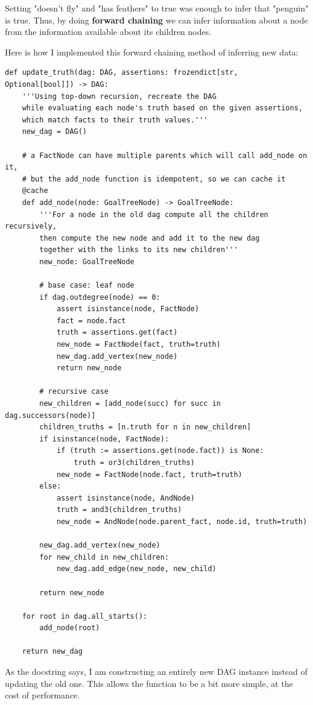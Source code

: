 \documentclass[11pt]{article}
\begin{document}
Setting "doesn't fly" and "has feathers" to true was enough to infer that "penguin" is true.
Thus, by doing \textbf{forward chaining} we can infer information about a node
from the information available about its children nodes.

Here is how I implemented this forward chaining method of inferring new data:
\begin{verbatim}
def update_truth(dag: DAG, assertions: frozendict[str, Optional[bool]]) -> DAG:
    '''Using top-down recursion, recreate the DAG
    while evaluating each node's truth based on the given assertions,
    which match facts to their truth values.'''
    new_dag = DAG()

    # a FactNode can have multiple parents which will call add_node on it,
    # but the add_node function is idempotent, so we can cache it
    @cache
    def add_node(node: GoalTreeNode) -> GoalTreeNode:
        '''For a node in the old dag compute all the children recursively,
        then compute the new node and add it to the new dag
        together with the links to its new children'''
        new_node: GoalTreeNode

        # base case: leaf node
        if dag.outdegree(node) == 0:
            assert isinstance(node, FactNode)
            fact = node.fact
            truth = assertions.get(fact)
            new_node = FactNode(fact, truth=truth)
            new_dag.add_vertex(new_node)
            return new_node

        # recursive case
        new_children = [add_node(succ) for succ in dag.successors(node)]
        children_truths = [n.truth for n in new_children]
        if isinstance(node, FactNode):
            if (truth := assertions.get(node.fact)) is None:
                truth = or3(children_truths)
            new_node = FactNode(node.fact, truth=truth)
        else:
            assert isinstance(node, AndNode)
            truth = and3(children_truths)
            new_node = AndNode(node.parent_fact, node.id, truth=truth)

        new_dag.add_vertex(new_node)
        for new_child in new_children:
            new_dag.add_edge(new_node, new_child)

        return new_node

    for root in dag.all_starts():
        add_node(root)

    return new_dag
\end{verbatim}

As the docstring says, I am constructing an entirely new DAG instance
instead of updating the old one.
This allows the function to be a bit more simple, at the cost of performance.
\end{document}
